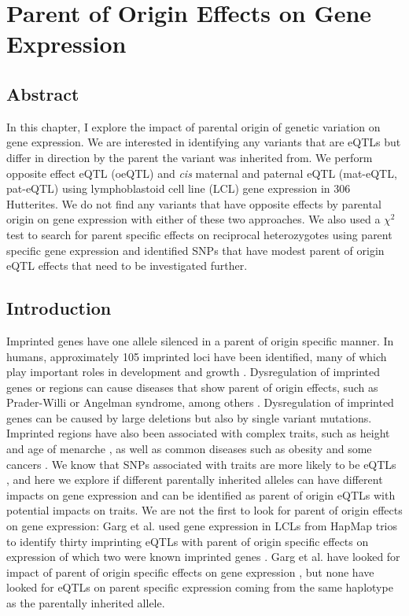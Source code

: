 
\chapter{Parent of Origin Effects on Gene Expression }\label{ch:poeqtl}
\section[Abstract]{Abstract}

In this chapter, I explore the impact of parental origin of genetic variation on gene expression. We are interested in identifying any variants that are eQTLs but differ in direction by the parent the variant was inherited from. We perform opposite effect eQTL (oeQTL) and \emph{cis} maternal and paternal eQTL (mat-eQTL, pat-eQTL) using lymphoblastoid cell line (LCL) gene expression in 306 Hutterites. We do not find any variants that have opposite effects by parental origin on gene expression with either of these two approaches. We also used a $\chi^2$ test to search for parent specific effects on reciprocal heterozygotes using parent specific gene expression and identified SNPs that have modest parent of origin eQTL effects that need to be investigated further.

\section{Introduction}\label{ch04-introduction}
Imprinted genes have one allele silenced in a parent of origin specific manner. In humans, approximately 105 imprinted loci have been identified, many of which play important roles in development and growth \cite{Falls1999,Peters2014}. Dysregulation of imprinted genes or regions can cause diseases that show parent of origin effects, such as Prader-Willi or Angelman syndrome, among others \cite{Peters2014}. Dysregulation of imprinted genes can be caused by large deletions but also by single variant mutations. Imprinted regions have also been associated with complex traits, such as height and age of menarche \citep{Benonisdottir:2016dz,Zoledziewska:2015do}, as well as common diseases such as obesity and some cancers \citep{Peters2014}. We know that SNPs associated with traits are more likely to be eQTLs \citep{Nicolae2010}, and here we explore if different parentally inherited alleles can have different impacts on gene expression and can be identified as parent of origin eQTLs with potential impacts on traits. We are not the first to look for parent of origin effects on gene expression: Garg et al. used gene expression in LCLs from HapMap trios to identify thirty imprinting eQTLs with parent of origin specific effects on expression of which two were known imprinted genes \citep{Garg2012a}. Garg et al. have looked for impact of parent of origin specific effects on gene expression \citep{Garg2012a}, but none have looked for eQTLs on parent specific expression coming from the same haplotype as the parentally inherited allele. 
	
